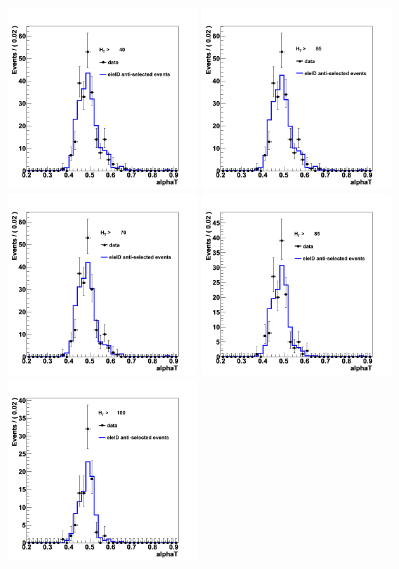 \begin{figure}[h!]

\includegraphics[width=50mm]{Plots/d-alphaT-1}
\includegraphics[width=50mm]{Plots/d-alphaT-2}
\includegraphics[width=50mm]{Plots/d-alphaT-3}
\includegraphics[width=50mm]{Plots/d-alphaT-4}
\hspace*{3mm}
\includegraphics[width=50mm]{Plots/d-alphaT-5}

\end{figure}
